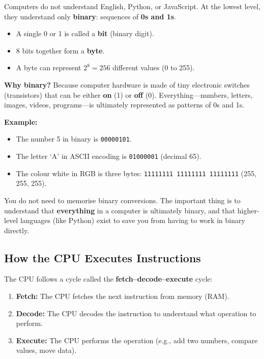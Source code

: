 \documentclass[12pt, a4paper, oneside]{book}
\begin{document}
Computers do not understand English, Python, or JavaScript. At the lowest level, they understand only \textbf{binary}: sequences of \textbf{0s and 1s}.

\begin{itemize}[leftmargin=2em]
    \item A single 0 or 1 is called a \textbf{bit} (binary digit).
    \item 8 bits together form a \textbf{byte}.
    \item A byte can represent $2^8 = 256$ different values (0 to 255).
\end{itemize}

\textbf{Why binary?} Because computer hardware is made of tiny electronic switches (transistors) that can be either \textbf{on} (1) or \textbf{off} (0). Everything---numbers, letters, images, videos, programs---is ultimately represented as patterns of 0s and 1s.

\textbf{Example:}
\begin{itemize}[leftmargin=2em]
    \item The number 5 in binary is \texttt{00000101}.
    \item The letter `A' in ASCII encoding is \texttt{01000001} (decimal 65).
    \item The colour white in RGB is three bytes: \texttt{11111111 11111111 11111111} (255, 255, 255).
\end{itemize}

\begin{notebox}
You do not need to memorise binary conversions. The important thing is to understand that \textbf{everything} in a computer is ultimately binary, and that higher-level languages (like Python) exist to save you from having to work in binary directly.
\end{notebox}

\subsection{How the CPU Executes Instructions}

The CPU follows a cycle called the \textbf{fetch--decode--execute} cycle:

\begin{enumerate}[leftmargin=2em]
    \item \textbf{Fetch:} The CPU fetches the next instruction from memory (RAM).
    \item \textbf{Decode:} The CPU decodes the instruction to understand what operation to perform.
    \item \textbf{Execute:} The CPU performs the operation (e.g., add two numbers, compare values, move data).
\end{enumerate}
\end{document}
